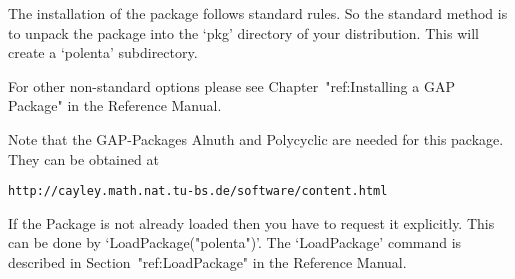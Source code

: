 
\null

The installation of the {\Polenta} package follows standard {\GAP} rules.
So the standard method is to unpack	 the package into the `pkg'
directory  of your {\GAP} distribution.  This will create a `polenta'
subdirectory. 

For other non-standard options please see  Chapter~"ref:Installing a
GAP Package" in the {\GAP} Reference Manual.

Note that the GAP-Packages Alnuth and Polycyclic are needed for this package.
They can be obtained at
\smallskip
   \centerline{\tt  http://cayley.math.nat.tu-bs.de/software/content.html}


\null

If the {\Polenta} Package is not already loaded 
then you have to request it explicitly. 
This  can be 
done by `LoadPackage("polenta")'.
The `LoadPackage' command is described in Section~"ref:LoadPackage"
in the {\GAP} Reference Manual.




